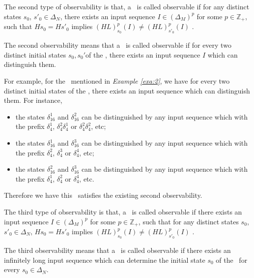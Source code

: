 \begin{definition}
	The second type of observability is that, a \BCN\ is called observable if for any distinct states $s_0$, ${s'}_0 \in \Delta_N$, there exists an input sequence $I\in(\Delta_M)^p$ for some $p\in \mathbb{Z}_+$, such that $Hs_0=H{s'}_0$ implies $(HL)^p_{s_0}(I)\neq (HL)^p_{{s'}_0}(I)$ \cite{Zhao2010Input}.
\end{definition}

The second observability means that a \BCN\ is called observable if for every two distinct initial states $s_0, s_0'$of the \BCN, there exists an input sequence $I$ which can distinguish them. 
\begin{example}
For example, for the \BCN\ mentioned in {\em Example \ref{exa:2}}, we have for every two distinct initial states of the \BCN, there exists an input sequence which can distinguish them.  For instance,
\begin{itemize}
  \item the states $\delta_{16}^1$ and $\delta_{16}^2$ can be distinguished by any input sequence which with the prefix $\delta_{4}^1$, $\delta_{4}^2 \delta_{4}^1$ or $\delta_{4}^2 \delta_{4}^2$, etc;
  \item the states $\delta_{16}^1$ and $\delta_{16}^3$  can be distinguished by any input sequence which with the prefix $\delta_{4}^2$, $\delta_{4}^3$ or $\delta_{4}^4$, etc;
  \item the states $\delta_{16}^2$ and $\delta_{16}^3$  can be distinguished by any input sequence which with the prefix $\delta_{4}^1$, $\delta_{4}^2$ or $\delta_{4}^4$, etc.
\end{itemize} 

Therefore we have this \BCN\ satisfies the existing second observability.
\end{example}   
\begin{definition}
The third type of observability is that, a \BCN\ is called observable if there exists an input sequence $I\in(\Delta_M)^p$ for some $p\in \mathbb{Z}_+$, such that for any distinct states $s_0$, ${s'}_0 \in \Delta_N$, $Hs_0=H{s'}_0$ implies $(HL)^p_{s_0}(I)\neq (HL)^p_{{s'}_0}(I)$ \cite{Cheng2011Identification}.
\end{definition}

The third observability means that a \BCN\ is called observable if there exists an infinitely long input sequence which can determine the initial state $s_0$ of the \BCN\ for every $s_0\in\Delta_N$.

